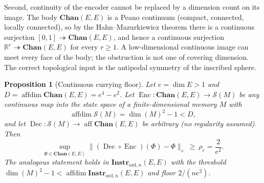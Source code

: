 \documentclass[11pt]{article}
\newtheorem{proposition}[theorem]{Proposition}
\DeclareMathOperator{\affdim}{affdim}
\DeclareMathOperator{\aff}{aff}
\begin{document}
Second, continuity of the encoder cannot be replaced by a dimension count on
its image. The body $\mathbf{Chan}(E,E)$ is a Peano continuum (compact,
connected, locally connected), so by the Hahn--Mazurkiewicz theorem
\cite{Willard1970} there is a continuous surjection $[0,1]\twoheadrightarrow
\mathbf{Chan}(E,E)$, and hence a continuous surjection
$\mathbb R^{r}\twoheadrightarrow\mathbf{Chan}(E,E)$ for every $r\ge1$. A
low-dimensional continuous image can meet every face of the body; the obstruction
is not one of covering dimension. The correct topological input is the antipodal
symmetry of the inscribed sphere.

\begin{proposition}[Continuous currying floor]
\label{prop:continuous-currying}
Let $e=\dim E>1$ and $D=\affdim\mathbf{Chan}(E,E)=e^4-e^2$. Let
$\operatorname{Enc}:\mathbf{Chan}(E,E)\to\mathcal S(M)$ be any continuous map
into the state space of a finite-dimensional memory $M$ with
\[
\affdim\mathcal S(M)=\dim(M)^2-1<D,
\]
and let $\operatorname{Dec}:\mathcal S(M)\to\aff\mathbf{Chan}(E,E)$ be arbitrary
(no regularity assumed). Then
\[
\sup_{\Phi\in\mathbf{Chan}(E,E)}
\bigl\|(\operatorname{Dec}\circ\operatorname{Enc})(\Phi)-\Phi\bigr\|_\diamond
\ \ge\ \rho_e=\frac2{e^2}.
\]
The analogous statement holds in $\mathbf{Instr}_{\mathrm{ord},n}(E,E)$ with the
threshold $\dim(M)^2-1<\affdim\mathbf{Instr}_{\mathrm{ord},n}(E,E)$ and floor
$2/(ne^2)$.
\end{proposition}
\end{document}
